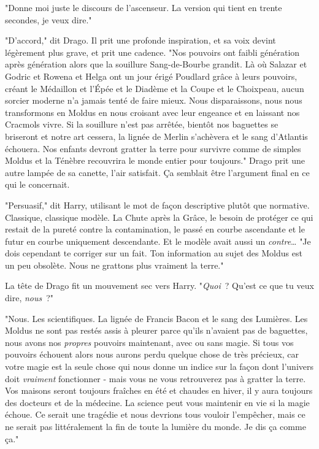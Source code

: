 "Donne moi juste le discours de l'ascenseur. La version qui tient en trente secondes, je veux dire."

"D'accord," dit Drago. Il prit une profonde inspiration, et sa voix devint légèrement plus grave, et prit une cadence. "Nos pouvoirs ont faibli génération après génération alors que la souillure Sang-de-Bourbe grandit. Là où Salazar et Godric et Rowena et Helga ont un jour érigé Poudlard grâce à leurs pouvoirs, créant le Médaillon et l'Épée et le Diadème et la Coupe et le Choixpeau, aucun sorcier moderne n'a jamais tenté de faire mieux. Nous disparaissons, nous nous transformons en Moldus en nous croisant avec leur engeance et en laissant nos Cracmols vivre. Si la souillure n'est pas arrêtée, bientôt nos baguettes se briseront et notre art cessera, la lignée de Merlin s'achèvera et le sang d'Atlantis échouera. Nos enfants devront gratter la terre pour survivre comme de simples Moldus et la Ténèbre recouvrira le monde entier pour toujours." Drago prit une autre lampée de sa canette, l'air satisfait. Ça semblait être l'argument final en ce qui le concernait.

"Persuasif," dit Harry, utilisant le mot de façon descriptive plutôt que normative. Classique, classique modèle. La Chute après la Grâce, le besoin de protéger ce qui restait de la pureté contre la contamination, le passé en courbe ascendante et le futur en courbe uniquement descendante. Et le modèle avait aussi un \emph{contre}… "Je dois cependant te corriger sur un fait. Ton information au sujet des Moldus est un peu obsolète. Nous ne grattons plus vraiment la terre."

La tête de Drago fit un mouvement sec vers Harry. "\emph{Quoi}~? Qu'est ce que tu veux dire, \emph{nous}~?"

"Nous. Les scientifiques. La lignée de Francis Bacon et le sang des Lumières. Les Moldus ne sont pas restés assis à pleurer parce qu'ils n'avaient pas de baguettes, nous avons nos \emph{propres} pouvoirs maintenant, avec ou sans magie. Si tous vos pouvoirs échouent alors nous aurons perdu quelque chose de très précieux, car votre magie est la seule chose qui nous donne un indice sur la façon dont l'univers doit \emph{vraiment} fonctionner - mais vous ne vous retrouverez pas à gratter la terre. Vos maisons seront toujours fraîches en été et chaudes en hiver, il y aura toujours des docteurs et de la médecine. La science peut vous maintenir en vie si la magie échoue. Ce serait une tragédie et nous devrions tous vouloir l'empêcher, mais ce ne serait pas littéralement la fin de toute la lumière du monde. Je dis ça comme ça."

